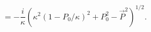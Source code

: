 \begin{equation}
 [x_{0},P_{i}]=-\frac{i}{\kappa}(\kappa^{2}(1-P_{0}/\kappa)^{2}+P_{0}^{2}-\vec{P}^{2})^{1/2}.
\end{equation}

